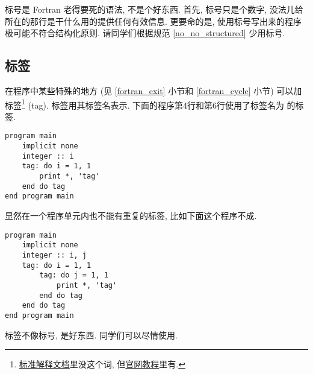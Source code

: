 标号是 Fortran 老得要死的语法, 不是个好东西. 首先, 标号只是个数字, 没法儿给所在的那行是干什么用的提供任何有效信息. 更要命的是, 使用标号写出来的程序极可能不符合结构化原则. 请同学们根据规范 \ref{no_no_structured} 少用标号.

\subsection{标签}

在程序中某些特殊的地方 (见 \ref{fortran_exit} 小节和 \ref{fortran_cycle} 小节) 可以加标签\footnote{\href{https://j3-fortran.org/doc/year/24/24-007.pdf}{标准解释文档}里没这个词, 但\href{https://fortran-lang.org/learn/quickstart/}{官网教程}里有.} (tag). 标签用其标签名表示. 下面的程序第4行和第6行使用了标签名为  的标签.
\begin{lstlisting}
program main
    implicit none
    integer :: i
    tag: do i = 1, 1
        print *, 'tag'
    end do tag
end program main
\end{lstlisting}

显然在一个程序单元内也不能有重复的标签, 比如下面这个程序不成.
\begin{lstlisting}
program main
    implicit none
    integer :: i, j
    tag: do i = 1, 1
        tag: do j = 1, 1
            print *, 'tag'
        end do tag
    end do tag
end program main
\end{lstlisting}

标签不像标号, 是好东西. 同学们可以尽情使用.
